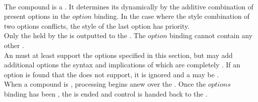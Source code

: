  \\

The compound  is a . It determines its  dynamically by the additive combination of present options in the \inline$option$ binding. In the case where the style combination of two options conflicts, the style of the last option has priority. \\

Only the  held by the  is outputted to the . The \inline$option$ binding cannot contain any other .\\

An  must at least support the options specified in this section, but may add additional options the syntax and implications of which are completely . If an option is found that the  does not support, it is ignored and a  may be . \\

When a compound  is , processing begins anew over the . Once the \inline$options$ binding has been , the  is ended and control is handed back to the .











